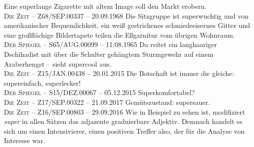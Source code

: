 \ea \label{subba}
\ea Eine superlange Zigarette mit altem Image soll den Markt erobern.  \\  \label{ziga}
\textsc{Die Zeit} -- Z68/SEP.00337 -- 20.09.1968
\ex Die Sitzgruppe ist superwuchtig und von amerikanischer Bequemlichkeit, ein weiß gestrichenes schmiedeeisernes Gitter und eine großflächige Bildertapete teilen die Eßgarnitur vom übrigen Wohnraum. \\  \label{sitz}
\textsc{Der Spiegel} -- S65/AUG.00099 -- 11.08.1965
\ex Da reitet ein langhaariger Dschihadist mit über die Schulter gehängtem Sturmgewehr auf einem Araberhengst -- sieht supercool aus.\\  \label{langhaar}
\textsc{Die Zeit} -- Z15/JAN.00438 -- 20.01.2015
\ex Die Botschaft ist immer die gleiche: supereinfach, superlecker!\\  \label{ausruf}
\textsc{Der Spiegel} -- S15/DEZ.00067 -- 05.12.2015
\ex Superkomfortabel?\\  \label{komfort}
\textsc{Die Zeit} -- Z17/SEP.00322 -- 21.09.2017
\ex Gemütszustand: supersauer. \\  \label{sauer}
\textsc{Die Zeit} -- Z16/SEP.00803 -- 29.09.2016
\z
\z
Wie in Beispiel  zu sehen ist, modifiziert \textit{super} in allen Sätzen das adjazente graduierbare Adjektiv. Demnach handelt es sich um einen Intensivierer, einen positiven Treffer also, der für die Analyse von Interesse war.

